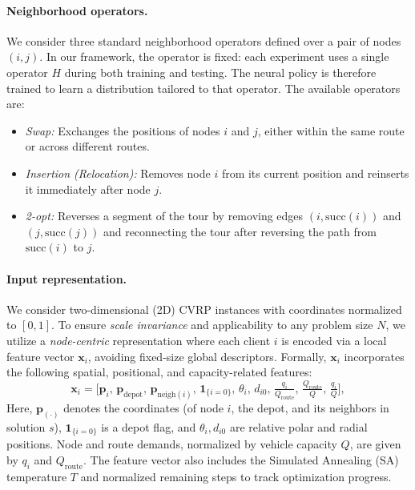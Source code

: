 \documentclass[letterpaper]{article} %
\begin{document}
\paragraph{Neighborhood operators.}

We consider three standard neighborhood operators defined over a pair of nodes $(i, j)$. In our framework, the operator is fixed: each experiment uses a single operator $H$ during both training and testing. The neural policy is therefore trained to learn a distribution tailored to that operator. The available operators are:

\begin{itemize}
    \item \textit{Swap:} Exchanges the positions of nodes $i$ and $j$, either within the same route or across different routes.
    \item \textit{Insertion (Relocation):} Removes node $i$ from its current position and reinserts it immediately after node $j$.
    \item \textit{2-opt:} Reverses a segment of the tour by removing edges $(i,\text{succ}(i))$ and $(j,\text{succ}(j))$ and reconnecting the tour after reversing the path from $\text{succ}(i)$ to $j$.
\end{itemize}


\paragraph{Input representation.}

We consider two-dimensional (2D) CVRP instances with coordinates normalized to $[0, 1]$. To ensure \textit{scale invariance} and applicability to any problem size $N$, we utilize a \textit{node-centric} representation where each client $i$ is encoded via a local feature vector $\mathbf{x}_i$, avoiding fixed-size global descriptors. Formally, $\mathbf{x}_i$ incorporates the following spatial, positional, and capacity-related features:
\begin{equation*}
    \mathbf{x}_i =
    \big[
        \mathbf{p}_i,\, \mathbf{p}_{\text{depot}},\,
        \mathbf{p}_{\text{neigh}(i)},\,
        \mathbf{1}_{\{i=0\}},\,
        \theta_i,\, d_{i0},\,
        \tfrac{q_i}{Q_{\text{route}}},\,
        \tfrac{Q_{\text{route}}}{Q},\,
        \tfrac{q_i}{Q}
    \big],
\end{equation*}
Here, $\mathbf{p}_{(\cdot)}$ denotes the coordinates (of node $i$, the depot, and its neighbors in solution $s$), $\mathbf{1}_{\{i=0\}}$ is a depot flag, and $\theta_i, d_{i0}$ are relative polar and radial positions. Node and route demands, normalized by vehicle capacity $Q$, are given by $q_i$ and $Q_{\text{route}}$. The feature vector also includes the Simulated Annealing (SA) temperature $T$ and normalized remaining steps to track optimization progress.
\end{document}
